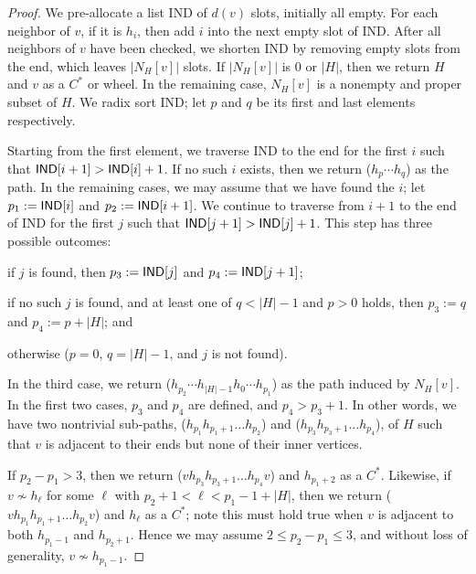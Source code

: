 \documentclass[10pt]{article}
\newcommand{\hv}[1]{\ensuremath{N_H[#1]}}
\begin{document}
\begin{proof}
  We pre-allocate a list {\sf IND} of $d(v)$ slots, initially all
  empty.  For each neighbor of $v$, if it is $h_i$, then add $i$ into
  the next empty slot of {\sf IND}.  After all neighbors of $v$ have
  been checked, we shorten {\sf IND} by removing empty slots from the
  end, which leaves $|N_H[v]|$ slots.  If $|N_H[v]|$ is $0$ or $|H|$,
  then we return $H$ and $v$ as a $C^*$ or wheel.  In the remaining
  case, $N_H[v]$ is a nonempty and proper subset of $H$.  We radix
  sort {\sf IND}; let $p$ and $q$ be its first and last elements
  respectively.

  Starting from the first element, we traverse {\sf IND} to the end
  for the first $i$ such that ${\sf IND}[i+1] > {\sf IND}[i] + 1$.  If
  no such $i$ exists, then we return ($h_p\cdots h_q$) as the path.
  In the remaining cases, we may assume that we have found the $i$;
  let $p_1 := {\sf IND}[i]$ and $p_2 := {\sf IND}[i+1]$.  We continue
  to traverse from $i+1$ to the end of {\sf IND} for the first $j$
  such that ${\sf IND}[j+1] > {\sf IND}[j] + 1$.  This step has three
  possible outcomes:
  \begin{inparaenum}[(1)]
  \item if $j$ is found, then $p_3 := {\sf IND}[j]$ and $p_4 := {\sf
      IND}[j+1]$;
  \item if no such $j$ is found, and at least one of $q<|H|-1$ and
    $p>0$ holds, then $p_3 := q$ and $p_4 :=  p + |H|$; and
  \item otherwise ($p=0$, $q=|H|-1$, and $j$ is not found).
  \end{inparaenum}
  In the third case, we return ($h_{p_2}\cdots h_{|H| - 1} h_0 \cdots
  h_{p_1}$) as the path induced by \hv{v}.  In the first two cases,
  $p_3$ and $p_4$ are defined, and $p_4 > p_3 +1$.  In other words, we
  have two nontrivial sub-paths, ($h_{p_1} h_{p_1+1}\dots h_{p_2}$)
  and ($h_{p_3} h_{p_3+1}\dots h_{p_4}$), of $H$ such that $v$ is
  adjacent to their ends but none of their inner vertices.

  If $p_2 - p_1 >3$, then we return ($v h_{p_3} h_{p_3+1}\dots h_{p_4}
  v$) and $h_{p_1 + 2}$ as a $C^*$.  Likewise, if $v\not\sim h_{\ell}$
  for some $\ell$ with $p_2 + 1<\ell<p_1 - 1 + |H|$, then we return
  ($v h_{p_1} h_{p_1+1}\dots h_{p_2} v$) and $h_{\ell}$ as a $C^*$;
  note this must hold true when $v$ is adjacent to both $h_{p_1 - 1}$
  and $h_{p_2 + 1}$.  Hence we may assume $2\le p_2 - p_1\le 3$, and
  without loss of generality, $v\not\sim h_{p_1 - 1}$.  


\end{proof}
\end{document}
